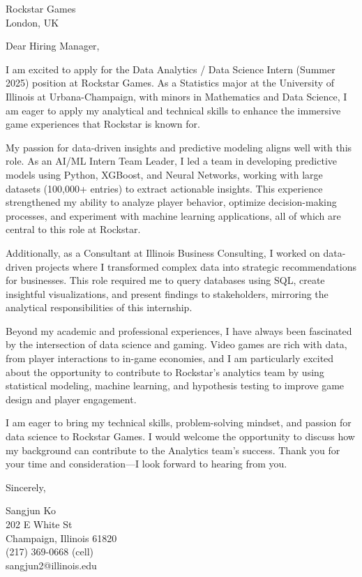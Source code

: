 \documentclass{letter}
\begin{document}
\begin{letter}{Rockstar Games\\
    London, UK
    }


\opening{Dear Hiring Manager,}
I am excited to apply for the Data Analytics / Data Science Intern (Summer 2025) position at Rockstar Games. As a Statistics major at the University of Illinois at Urbana-Champaign, with minors in Mathematics and Data Science, I am eager to apply my analytical and technical skills to enhance the immersive game experiences that Rockstar is known for.

My passion for data-driven insights and predictive modeling aligns well with this role. As an AI/ML Intern Team Leader, I led a team in developing predictive models using Python, XGBoost, and Neural Networks, working with large datasets (100,000+ entries) to extract actionable insights. This experience strengthened my ability to analyze player behavior, optimize decision-making processes, and experiment with machine learning applications, all of which are central to this role at Rockstar.

Additionally, as a Consultant at Illinois Business Consulting, I worked on data-driven projects where I transformed complex data into strategic recommendations for businesses. This role required me to query databases using SQL, create insightful visualizations, and present findings to stakeholders, mirroring the analytical responsibilities of this internship.

Beyond my academic and professional experiences, I have always been fascinated by the intersection of data science and gaming. Video games are rich with data, from player interactions to in-game economies, and I am particularly excited about the opportunity to contribute to Rockstar’s analytics team by using statistical modeling, machine learning, and hypothesis testing to improve game design and player engagement.

I am eager to bring my technical skills, problem-solving mindset, and passion for data science to Rockstar Games. I would welcome the opportunity to discuss how my background can contribute to the Analytics team’s success. Thank you for your time and consideration—I look forward to hearing from you.



\closing{Sincerely,
}

Sangjun Ko\\
202 E White St\\
Champaign, Illinois 61820\\
(217) 369-0668 (cell)\\sangjun2@illinois.edu
\end{letter}
\end{document}
